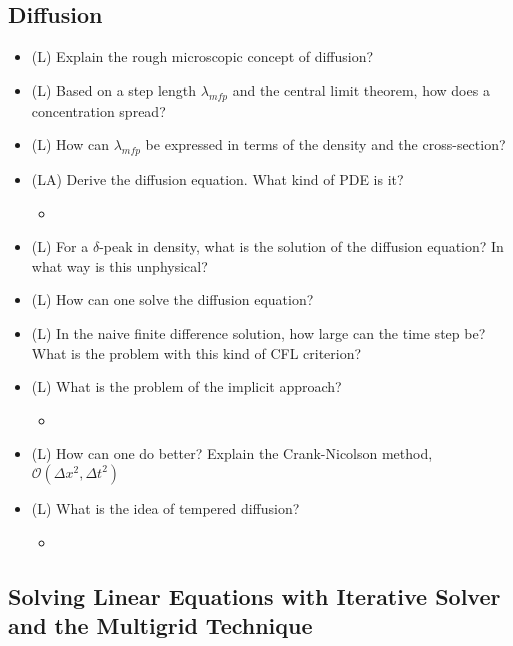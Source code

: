 \subsection*{Diffusion}

\begin{itemize}
    \item (L) Explain the rough microscopic concept of diffusion?
    \item (L) Based on a step length $\lambda_{mfp}$ and the central limit theorem, how does a concentration spread?
    \item (L) How can $\lambda_{mfp}$ be expressed in terms of the density and the cross-section?
    \item (LA) Derive the diffusion equation. What kind of PDE is it?
    \begin{itemize}
        \item {}
    \end{itemize}
    \item (L) For a $\delta$-peak in density, what is the solution of the diffusion equation? In what way is this unphysical?
    \item (L) How can one solve the diffusion equation?
    \item (L) In the naive finite difference solution, how large can the time step be? What
    is the problem with this kind of CFL criterion?
    \item (L) What is the problem of the implicit approach?
    \begin{itemize}
        \item {}
    \end{itemize}
    \item (L) How can one do better? Explain the Crank-Nicolson method, $\mathcal{O}(\Delta x^2, \Delta t^2)$
    \item (L) What is the idea of tempered diffusion?
    \begin{itemize}
        \item {}
    \end{itemize}
\end{itemize}

\subsection*{Solving Linear Equations with Iterative Solver and the Multigrid Technique}

